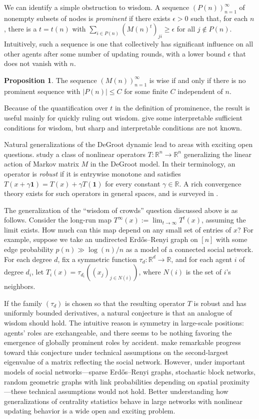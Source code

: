 \documentclass{notices}
\theoremstyle{definition}\newtheorem{problem}{Problem}
\theoremstyle{definition} \newtheorem{remark}{Remark}
\theoremstyle{definition} \newtheorem{claim}{Claim}
\theoremstyle{definition} \newtheorem{thm}{Theorem}
\theoremstyle{definition} \newtheorem*{thmNoNum}{Theorem}
\theoremstyle{definition} \newtheorem{definition}{Definition}
\theoremstyle{definition} \theoremstyle{remark}
\theoremstyle{definition} \newtheorem{note}{Note}
\theoremstyle{definition} \newtheorem{notation}{Notation}
\theoremstyle{definition} \theoremstyle{plain}
\theoremstyle{definition} \newtheorem{condition}{Condition}
\theoremstyle{definition} \newtheorem{lem}{Lemma}
\theoremstyle{definition} \newtheorem{corollary}{Corollary}
\theoremstyle{definition} \newtheorem{prop}{Proposition}
\theoremstyle{definition} \newtheorem{ax}{Axiom}
\theoremstyle{definition} \newtheorem{assumption}{Assumption}
\theoremstyle{definition} \newtheorem{example}{Example}
\theoremstyle{definition} \newtheorem{rmk}{Remark}
\theoremstyle{definition} \newtheorem{res}{Result}
\theoremstyle{definition} \newtheorem{que}{Question}
\theoremstyle{definition} \newtheorem{conjecture}{Conjecture}
\theoremstyle{definition}
\begin{document}
We can identify a simple obstruction to wisdom. A sequence $(P(n))_{n=1}^\infty$ of nonempty subsets of nodes is \emph{prominent} if there exists $\epsilon > 0$ such that, for each $n$, there is a $t=t(n)$ with
$\sum_{i \in P(n)} (M(n)^t)_{ji} \geq \epsilon$ for all $j \notin P(n)$.
Intuitively, such a sequence is one that collectively has significant influence on all other agents after some number of updating rounds, with a lower bound $\epsilon$ that does not vanish with $n$.
\begin{prop}  The sequence $(M(n))_{n=1}^\infty$ is wise if and only if there is no prominent sequence with $|P(n)| \le C$ for some finite  $C$ independent of $n$. \end{prop}
Because of the quantification over $t$ in the definition of prominence, the result is useful mainly for quickly ruling out wisdom. \cite{GolubJackson2010} give some interpretable sufficient conditions for wisdom, but sharp and interpretable conditions are not known.

Natural generalizations of the DeGroot dynamic lead to areas with exciting open questions. \cite{CCL} study a class of nonlinear operators $T : \mathbb{R}^n \to \mathbb{R}^n$ generalizing the linear action of Markov matrix $M$ in the DeGroot model. In their terminology, an operator is \emph{robust} if it is entrywise monotone and satisfies $T(x+\gamma \bm{1})=T(x)+\gamma T(\bm{1})$ for every constant $\gamma \in \mathbb{R}$. A rich convergence theory exists for such operators in general spaces, and is surveyed in \cite{CCL,lemmens2012nonlinear}. 

The generalization of the ``wisdom of crowds'' question discussed above is as follows. Consider the long-run map $T^\infty(x):=\lim_{t\to\infty}T^t(x)$, assuming the limit exists. How much can this map depend on any small set of entries of $x$? For example, suppose we take an undirected Erd\H{o}s--Renyi graph on $[n]$ with some edge probability $p(n) \gg \log(n)/n$ as a model of a connected social network. For each degree $d$, fix a symmetric function $\tau_d:\mathbb{R}^d\to\mathbb{R}$, and for each agent $i$ of degree $d_i$, let $T_i(x) = \tau_{d_i}((x_j)_{j \in N(i)})$, where $N(i)$ is the set of $i$'s neighbors. 

If the family $(\tau_d)$ is chosen so that the resulting operator $T$ is robust and has uniformly bounded derivatives, a natural conjecture is that an analogue of wisdom should hold. The intuitive reason is symmetry in large-scale positions: agents' roles are exchangeable, and there seems to be nothing favoring the emergence of globally prominent roles by accident. \cite{CCL} make remarkable progress toward this conjecture under technical assumptions on the second-largest eigenvalue of a matrix reflecting the social network. However, under important models of social networks---sparse Erd\H{o}s--Renyi graphs, stochastic block networks, random geometric graphs with link probabilities depending on spatial proximity---these technical assumptions would not hold.  Better understanding how generalizations of centrality statistics behave in large networks with nonlinear updating behavior is a wide open and exciting problem.
\end{document}
